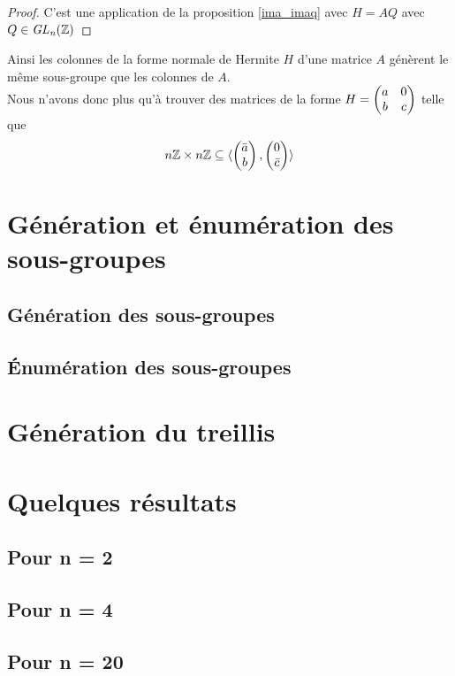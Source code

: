 \documentclass[11pt]{article}
\begin{document}
\begin{proof}
	C'est une application de la proposition \ref{ima_imaq} avec $H= AQ$ avec $Q \in \it {GL}_n(\mathbb Z)$

\end{proof}

Ainsi les colonnes de la forme normale de Hermite $H$ d'une matrice $A$ génèrent le même
sous-groupe que les colonnes de $A$.\\
Nous n'avons donc plus qu'à trouver des matrices de la forme
$H = \begin{pmatrix} a & 0\\ b & c \end{pmatrix}$ telle que
$$n\mathbb Z \times n\mathbb Z \subseteq \langle \begin{pmatrix} \bar a\\ b \end{pmatrix},\begin{pmatrix} 0\\ \bar c \end{pmatrix} \rangle$$

\section {Génération et énumération des sous-groupes}
\subsection{Génération des sous-groupes}
\subsection{Énumération des sous-groupes}

\section{Génération du treillis}

\section{Quelques résultats}
\subsection{Pour n = 2}
\subsection{Pour n = 4}
\subsection{Pour n = 20}
\end{document}
